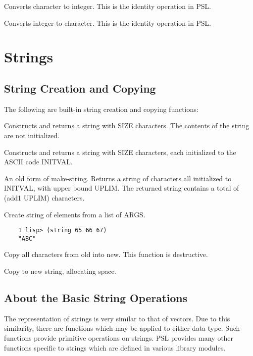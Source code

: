 {    Converts  character  to  integer.    This  is  the  identity
    operation in PSL.
}

{    Converts  integer  to  character.    This  is  the  identity
    operation in PSL.
}
\section{Strings}

\subsection{String Creation and Copying}

  The  following  are  built-in  string  creation  and   copying
functions:


{    Constructs  and  returns a string with SIZE characters.  The
    contents of the string are not initialized.
}

{    Constructs and returns a string with  SIZE characters,  each
    initialized to the ASCII code INITVAL.
}

{    An  old form of make-string.  Returns a string of characters
    all initialized to INITVAL, with upper  bound  UPLIM.    The
    returned string contains a total of (add1 UPLIM) characters.
}

{    Create string of elements from  a list of ARGS.
}
\begin{verbatim}
    1 lisp> (string 65 66 67)
    "ABC"
\end{verbatim}

{    Copy  all  characters from old  into new.  This function  is
    destructive.
}

{    Copy to new string, allocating space.
}
\subsection{About the Basic String Operations}

  The representation of strings  is  very  similar  to  that  of
vectors.   Due to this similarity, there are functions which may
be  applied  to  either  data  type.    Such  functions  provide
primitive  operations  on  strings.    PSL  provides  many other
functions specific to  strings  which  are  defined  in  various
library modules.

